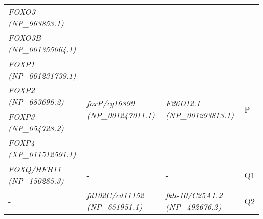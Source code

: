 \documentclass[../main.tex]{subfiles}
\begin{document}
\begin{longtable}{llll}
	\textit{FOXO3 (NP\_963853.1)}                           &                                                                                                        &                                                                                                    &                       \\
	\textit{FOXO3B (NP\_001355064.1)}                       &                                                                                                        &                                                                                                    &                       \\ [0.2cm]
	\textit{FOXP1 (NP\_001231739.1)}                        & \multirow{4}{*}{\textit{foxP/cg16899 (NP\_001247011.1)}}                                               & \multirow{4}{*}{\textit{F26D12.1 (NP\_001293813.1)}}                                               & \multirow{4}{*}{P}    \\
	\textit{FOXP2 (NP\_683696.2)}                           &                                                                                                        &                                                                                                    &                       \\
	\textit{FOXP3 (NP\_054728.2)}                           &                                                                                                        &                                                                                                    &                       \\
	\textit{FOXP4 (XP\_011512591.1)}                        &                                                                                                        &                                                                                                    &                       \\ [0.2cm]
	\textit{FOXQ/HFH11 (NP\_150285.3)}                      & -                                                                                                      & -                                                                                                  & Q1                    \\ [0.1cm]
	-                                                       & \textit{fd102C/cd11152 (NP\_651951.1)}                                                                 & \textit{fkh-10/C25A1.2 (NP\_492676.2)}                                                             & Q2                    \\ [0.1cm]

\end{longtable}
\end{document}
